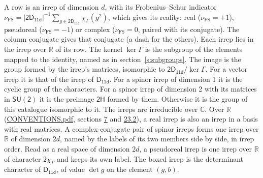 \documentclass[10pt,a4paper]{article}
\numberwithin{equation}{section}
\newcommand{\grp}[1]{\mathsf{#1}}
\newcommand{\irchar}[1]{\chi_{#1}}
\newcommand{\fsind}{\nu_{\mathrm{FS}}}
\begin{document}
\leavevmode\label{n:index.frobenius}\label{n:head.irrep}\label{n:head.reality}A row is an irrep of dimension $d$, with its Frobenius--Schur indicator $\fsind = |\grp{2D_{11d}}|^{-1}\allowbreak\sum_{g\in\grp{2D_{11d}}}\irchar{\Gamma}(g^2)$, which gives its reality: real ($\fsind = +1$), pseudoreal ($\fsind = -1$) or complex ($\fsind = 0$, paired with its conjugate). \label{n:head.conjugate}The column conjugate gives that conjugate (a dash for the others). \label{n:head.over.real}Each irrep lies in the irrep over $\mathbb{R}$ of its row. \label{n:head.kernel}The kernel $\ker\Gamma$ is the subgroup of the elements mapped to the identity, named as in section~\ref{s:subgroups}. \label{n:head.image}The image is the group formed by the irrep's matrices, isomorphic to $\grp{2D_{11d}}/\ker\Gamma$. For a vector irrep it is that of the irrep of \href{../../../rotation/data/pdf/D11d.pdf}{$\grp{D_{11d}}$}. For a spinor irrep of dimension 1 it is the cyclic group of the characters. For a spinor irrep of dimension 2 with its matrices in $\grp{SU(2)}$ it is the preimage $\grp{2H}$ formed by them. Otherwise it is the group of this catalogue isomorphic to it. The irreps are irreducible over $\mathbb{C}$. Over $\mathbb{R}$ (\href{../../CONVENTIONS.pdf}{CONVENTIONS.pdf}, sections \href{../../../rotation/CONVENTIONS.pdf\#conv.7}{7} and \href{../../CONVENTIONS.pdf\#conv.23.2}{23.2}), a real irrep is also an irrep in a basis with real matrices. A complex-conjugate pair of spinor irreps forms one irrep over $\mathbb{R}$ of dimension $2d$, named by the labels of its two members side by side, in irrep order. Read as a real space of dimension $2d$, a pseudoreal irrep is one irrep over $\mathbb{R}$ of character $2\irchar{\Gamma}$ and keeps its own label. \label{n:mark.determinant}The boxed irrep is the determinant character of \href{../../../rotation/data/pdf/D11d.pdf}{$\grp{D_{11d}}$}, of value $\det g$ on the element $(g, b)$.
\setlength{\emergencystretch}{2em}\par\setlength{\emergencystretch}{0pt}
\end{document}
